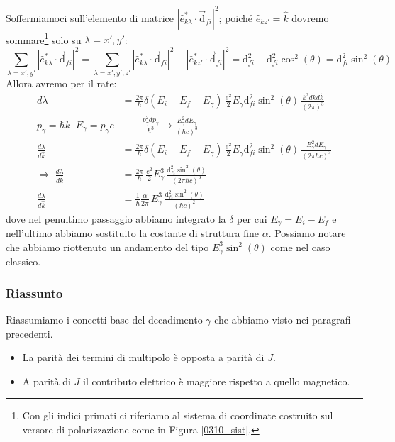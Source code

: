 \newline
\noindent Soffermiamoci sull'elemento di matrice $|\hat{e}^*_{k\lambda}\cdot \vec{\mathrm{d}}_{fi}|^2$; poiché $\hat{e}_{kz'} = \hat{k}$ dovremo sommare\footnote{Con gli indici primati ci riferiamo al sistema di coordinate costruito sul versore di polarizzazione come in Figura \ref{0310_sist}.} solo su $\lambda = x',y'$:
$$\sum_{\lambda = x',y'}|\hat{e}^*_{k\lambda}\cdot \vec{\mathrm{d}}_{fi}|^2 = \sum_{\lambda=x',y',z'} |\hat{e}^*_{k\lambda}\cdot \vec{\mathrm{d}}_{fi}|^2 - |\hat{e}^*_{kz'}\cdot \vec{\mathrm{d}}_{fi}|^2 = \mathrm{d}_{fi}^2 -\mathrm{d}_{fi}^2\cos^2{(\theta)} = \mathrm{d}_{fi}^2 \sin^2{(\theta)} $$
Allora avremo per il rate:
\begin{displaymath}
\begin{aligned}
d\lambda &= \frac{2\pi}{\hbar} \delta(E_i-E_f-E_\gamma) \,\frac{e^2}{2}E_\gamma \mathrm{d}_{fi}^2 \sin^2(\theta) \,  \frac{k^2dkd\hat{k}}{(2\pi)^3} \\
%
p_\gamma = \hbar k \;\; E_\gamma = p_\gamma c &\qquad\frac{p^2_\gamma dp_\gamma}{\hbar^3} \to \frac{E_\gamma^2 dE_\gamma}{(\hbar c)^3}\\
%
\frac{d\lambda}{d\hat{k}} &= \frac{2\pi}{\hbar} \delta(E_i-E_f-E_\gamma) \,\frac{e^2}{2}E_\gamma \mathrm{d}_{fi}^2 \sin^2(\theta) \, \frac{E_\gamma^2 dE_\gamma}{(2\pi\hbar c)^3} \\
%
\Rightarrow \; \frac{d\lambda}{d\hat{k}} &= \frac{2\pi}{\hbar} \,\frac{e^2}{2}E_\gamma^3 \, \frac{\mathrm{d}_{fi}^2 \sin^2(\theta)}{(2\pi \hbar c)^3} \\
%
\frac{d\lambda}{d\hat{k}} &= \frac{1}{\hbar} \frac{\alpha}{2\pi}\,E_\gamma^3 \, \frac{\mathrm{d}_{fi}^2 \sin^2(\theta)}{( \hbar c)^2}
\end{aligned}
\end{displaymath}
dove nel penultimo passaggio abbiamo integrato la $\delta$ per cui $E_\gamma = E_i - E_f$ e nell'ultimo abbiamo sostituito la costante di struttura fine $\alpha$. Possiamo notare che abbiamo riottenuto un andamento del tipo $E^3_\gamma \sin^2(\theta)$ come nel caso classico.

\subsubsection{Riassunto}
Riassumiamo i concetti base del decadimento $\gamma$ che abbiamo visto nei paragrafi precedenti.
\begin{itemize}
    \item La parità dei termini di multipolo è opposta a parità di $J$.
    \item A parità di $J$ il contributo elettrico è maggiore rispetto a quello magnetico.
\end{itemize}

